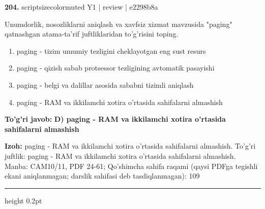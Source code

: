 \documentclass[10pt,a4paper]{article}
\begin{document}
{\bfseries\sffamily\color{ink} 204.} {scriptsizecolor{muted} Y1 | review | e2298b8a}
\par
Unumdorlik, nosozliklarni aniqlash va xavfsiz xizmat mavzusida "paging" qatnashgan atama-ta'rif juftliklaridan to'g'risini toping.
\begin{enumerate}[label=\Alph*),leftmargin=9mm]
\item paging - tizim umumiy tezligini cheklayotgan eng sust resurs
\item paging - qizish sabab protsessor tezligining avtomatik pasayishi
\item paging - belgi va dalillar asosida sababni tizimli aniqlash
\item paging - RAM va ikkilamchi xotira o'rtasida sahifalarni almashish
\end{enumerate}
\begin{tcolorbox}[enhanced,breakable,colback=teal!4,colframe=teal!60!black,boxrule=0.45pt,arc=1.2mm,left=2.7mm,right=2.7mm,top=1.8mm,bottom=1.8mm,before skip=2mm,after skip=2mm]
{\bfseries\sffamily\color{teal}To'g'ri javob:} \textbf{D) paging - RAM va ikkilamchi xotira o'rtasida sahifalarni almashish}
\par\smallskip
{\bfseries Izoh:} paging - RAM va ikkilamchi xotira o'rtasida sahifalarni almashish. To'g'ri juftlik: paging - RAM va ikkilamchi xotira o'rtasida sahifalarni almashish. Manba: CAM10/11, PDF 24-61; Qo'shimcha sahifa raqami (qaysi PDFga tegishli ekani aniqlanmagan; darslik sahifasi deb tasdiqlanmagan): 109
\end{tcolorbox}
\vspace{2mm}\hrule height 0.2pt\vspace{3mm}
\end{document}

